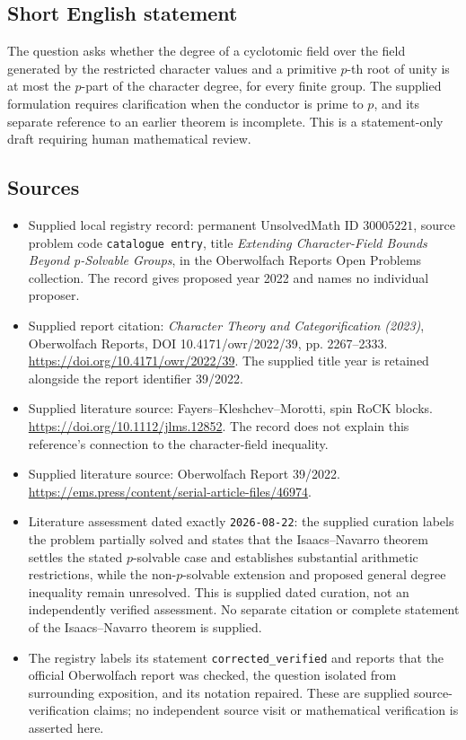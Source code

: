 \documentclass[11pt]{article}
\begin{document}
\subsection{Short English statement}
The question asks whether the degree of a cyclotomic field over the field generated by the restricted character values and a primitive \(p\)-th root of unity is at most the \(p\)-part of the character degree, for every finite group. The supplied formulation requires clarification when the conductor is prime to \(p\), and its separate reference to an earlier theorem is incomplete. This is a statement-only draft requiring human mathematical review.
\subsection{Sources}
\begin{itemize}
\item Supplied local registry record: permanent UnsolvedMath ID \(30005221\), source problem code \texttt{catalogue entry}, title \emph{Extending Character-Field Bounds Beyond p-Solvable Groups}, in the Oberwolfach Reports Open Problems collection. The record gives proposed year 2022 and names no individual proposer.
\item Supplied report citation: \emph{Character Theory and Categorification (2023)}, Oberwolfach Reports, DOI 10.4171/owr/2022/39, pp. 2267--2333. \url{https://doi.org/10.4171/owr/2022/39}. The supplied title year is retained alongside the report identifier 39/2022.
\item Supplied literature source: Fayers--Kleshchev--Morotti, spin RoCK blocks. \url{https://doi.org/10.1112/jlms.12852}. The record does not explain this reference's connection to the character-field inequality.
\item Supplied literature source: Oberwolfach Report 39/2022. \url{https://ems.press/content/serial-article-files/46974}.
\item Literature assessment dated exactly \texttt{2026-08-22}: the supplied curation labels the problem partially solved and states that the Isaacs--Navarro theorem settles the stated \(p\)-solvable case and establishes substantial arithmetic restrictions, while the non-\(p\)-solvable extension and proposed general degree inequality remain unresolved. This is supplied dated curation, not an independently verified assessment. No separate citation or complete statement of the Isaacs--Navarro theorem is supplied.
\item The registry labels its statement \texttt{corrected\_verified} and reports that the official Oberwolfach report was checked, the question isolated from surrounding exposition, and its notation repaired. These are supplied source-verification claims; no independent source visit or mathematical verification is asserted here.
\end{itemize}
\end{document}
